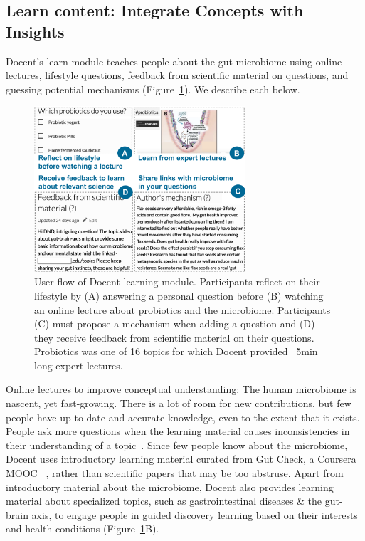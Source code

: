 \subsection{Learn content: Integrate Concepts with Insights}
Docent’s learn module teaches people about the gut microbiome using online lectures, lifestyle questions, feedback from scientific material on questions, and guessing potential mechanisms (Figure~\ref{fig:docent-2}). We describe each below. 

\begin{figure}[h] 
  \centering
  \includegraphics[width=0.7\textwidth]{figures/docent/fig-2.png}
  \caption[User flow of Docent learning module]
{User flow of Docent learning module. Participants reflect on their lifestyle by (A) answering a personal question before (B) watching an online lecture about probiotics and the microbiome. Participants (C) must propose a mechanism when adding a question and (D) they receive feedback from scientific material on their questions. Probiotics was one of 16 topics for which Docent provided ~5min long expert lectures.}
  \label{fig:docent-2}
\end{figure}

Online lectures to improve conceptual understanding: The human microbiome is nascent, yet fast-growing. There is a lot of room for new contributions, but few people have up-to-date and accurate knowledge, even to the extent that it exists. People ask more questions when the learning material causes inconsistencies in their understanding of a topic~\cite{Miyake1979a}. Since few people know about the microbiome, Docent uses introductory learning material curated from Gut Check, a Coursera MOOC ~\cite{Knight2016}, rather than scientific papers that may be too abstruse. Apart from introductory material about the microbiome, Docent also provides learning material about specialized topics, such as gastrointestinal diseases \& the gut-brain axis, to engage people in guided discovery learning based on their interests and health conditions (Figure~\ref{fig:docent-2}B).


